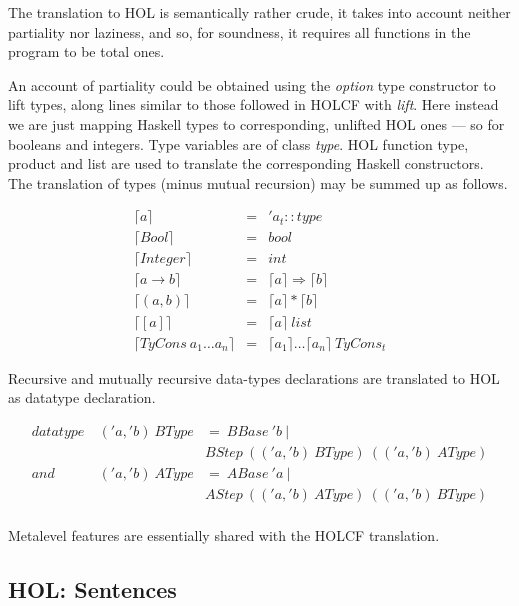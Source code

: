 \documentclass{llncs}
\begin{document}
The translation to HOL is semantically rather crude, it takes into
account neither partiality nor laziness, and so, for soundness, it
requires all functions in the program to be total ones.

An account of partiality could be obtained using the \emph{option}
type constructor to lift types, along lines similar to those followed
in HOLCF with \emph{lift}. Here instead we are just mapping Haskell
types to corresponding, unlifted HOL ones --- so for booleans and
integers. Type variables are of class \emph{type}.  HOL function type,
product and list are used to translate the corresponding Haskell
constructors. The translation of types (minus mutual recursion) may be
summed up as follows.


$$\begin{array}{lcl}
  \lceil a \rceil & = & 'a_{t}::type \\
  \lceil Bool \rceil & = & bool \\
  \lceil Integer \rceil & = & int \\
  \lceil a \to b \rceil & = & \lceil a \rceil \Rightarrow \lceil b \rceil \\
  \lceil (a,b) \rceil & = & \lceil a \rceil * \lceil b \rceil \\
  \lceil [a] \rceil & = & \lceil a \rceil \ list \\
  \lceil TyCons \ a_{1} \ldots a_{n} \rceil & = & \lceil a_{1} \rceil \ldots \lceil a_{n} \rceil \ TyCons_{t} 
\end{array}$$

\noindent Recursive and mutually recursive data-types declarations are
translated to HOL as datatype declaration.

$$\begin{array}{rll} datatype & \ ('a, 'b) \ BType & = \ BBase \ 'b \ | \\
  & & BStep \ (('a, 'b) \ BType) \ (('a, 'b) \ AType) \\
  and & \ ('a, 'b) \ AType & =  \ ABase \ 'a \ | \\
  & & AStep \ (('a, 'b) \ AType) \ (('a, 'b) \ BType) \\
\end{array}$$

\noindent Metalevel features are essentially shared with the HOLCF
translation.

\subsection{HOL: Sentences}
\end{document}
